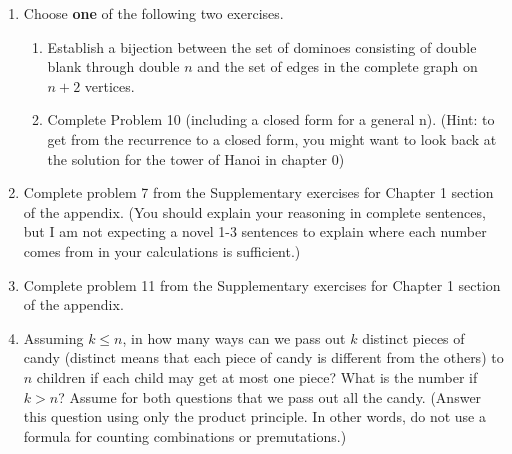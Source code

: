 \documentclass[12pt]{article}
\begin{document}
\begin{enumerate}
\item Choose {\bf one} of the following two exercises.
\begin{enumerate}
\item Establish a bijection between the set of dominoes consisting of double blank through double $n$ and the set of edges in the complete graph on $n+2$ vertices. 
\item Complete Problem 10 (including a closed form for a general n).  (Hint: to get from the recurrence to a closed form, you might want to look back at the solution for the tower of Hanoi in chapter 0)
\end{enumerate}
\item Complete problem 7 from the Supplementary exercises for Chapter 1 section of the appendix.  (You should explain your reasoning in complete sentences, but I am not expecting a novel 1-3 sentences to explain where each number comes from in your calculations is sufficient.)
\item Complete problem 11 from the Supplementary exercises for Chapter 1 section of the appendix.
\item Assuming $k\le n$, in how many ways can we pass out 
$k$ distinct pieces of candy (distinct means that each piece of candy is different from the others) to $n$ children if each child may get at most one piece? What is the number if $k>n$? Assume for both questions that we pass out all the candy. (Answer this question using only the product principle. In other words, do not use a formula for counting combinations or premutations.)

\end{enumerate}
\end{document}
